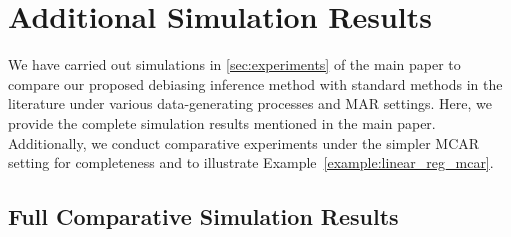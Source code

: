 \documentclass[ejsv2,noshowframe]{imsart}
\theoremstyle{plain}
\theoremstyle{definition}
\theoremstyle{remark}
\begin{document}
\section{Additional Simulation Results}
\label{app:add_simulation}

We have carried out simulations in \autoref{sec:experiments} of the main paper to compare our proposed debiasing inference method with standard methods in the literature under various data-generating processes and MAR settings. Here, we provide the complete simulation results mentioned in the main paper. Additionally, we conduct comparative experiments under the simpler MCAR setting for completeness and to illustrate Example~\ref{example:linear_reg_mcar}.

\subsection{Full Comparative Simulation Results}
\label{subapp:full_sim_res}
\end{document}
